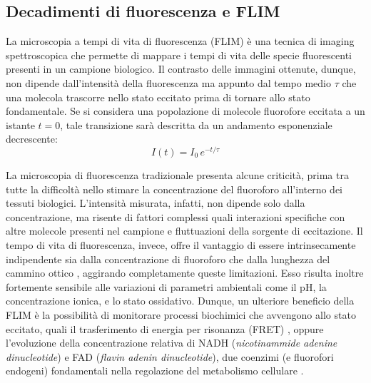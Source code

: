 
\subsection{Decadimenti di fluorescenza e FLIM}

La microscopia a tempi di vita di fluorescenza (FLIM) è una tecnica di imaging spettroscopica che permette di mappare i tempi di vita delle specie fluorescenti presenti in un campione biologico. Il contrasto delle immagini ottenute, dunque, non dipende dall'intensità della fluorescenza ma appunto dal tempo medio $\tau$ che una molecola trascorre nello stato eccitato prima di tornare allo stato fondamentale.
Se si considera una popolazione di molecole fluorofore eccitata a un istante $t=0$, tale transizione sarà descritta da un andamento esponenziale decrescente:
\begin{equation}
    I(t) =I_0 \, e^{-t/\tau}
    \label{eq:decadimento}
\end{equation}

La microscopia di fluorescenza tradizionale presenta alcune criticità, prima tra tutte la difficoltà nello stimare la concentrazione del fluoroforo all'interno dei tessuti biologici. L'intensità misurata, infatti, non dipende solo dalla concentrazione, ma risente di fattori complessi quali interazioni specifiche con altre molecole presenti nel campione e fluttuazioni della sorgente di eccitazione.
Il tempo di vita di fluorescenza, invece, offre il vantaggio di essere intrinsecamente indipendente sia dalla concentrazione di fluoroforo che dalla lunghezza del cammino ottico \cite{bastiaensFluorescenceLifetimeImaging1999a}, aggirando completamente queste limitazioni.
Esso risulta inoltre fortemente sensibile alle variazioni di parametri ambientali come il pH, la concentrazione ionica, e lo stato ossidativo. Dunque, un ulteriore beneficio della FLIM è la possibilità di monitorare processi biochimici che avvengono allo stato eccitato, quali il trasferimento di energia per risonanza (FRET) \cite{bastiaensFluorescenceLifetimeImaging1999a}, oppure l'evoluzione della concentrazione relativa di NADH (\textit{nicotinammide adenine dinucleotide}) e FAD (\textit{flavin adenin dinucleotide}), due coenzimi (e fluorofori endogeni) fondamentali nella regolazione del metabolismo cellulare \cite{huComparisonPhasorAnalysis2023}.



